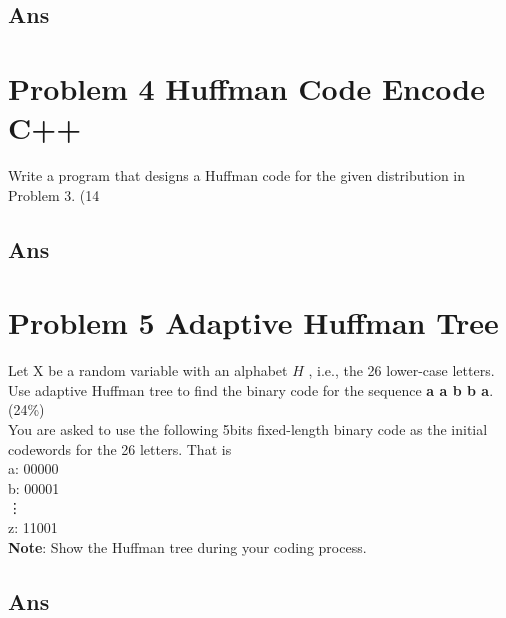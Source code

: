 \documentclass[a4paper, 11pt]{article}
\begin{document}
\subsection*{Ans}
\section*{Problem 4 Huffman Code Encode C++}
Write a program that designs a Huffman code for the given distribution in Problem 3. (14%
\subsection*{Ans}
\section*{Problem 5 Adaptive Huffman Tree}
Let X be a random variable with an alphabet $H$ , i.e., the 26 lower-case letters.
Use adaptive Huffman tree to find the binary code for the sequence \textbf{a a b b a}.
(24\%) \\
You are asked to use the following 5bits fixed-length binary code as the initial codewords for
the 26 letters. That is \\
a: 00000 \\
b: 00001 \\
\vdots \\
z: 11001 \\
\textbf{Note}: Show the Huffman tree during your coding process.
\subsection*{Ans}
\end{document}
